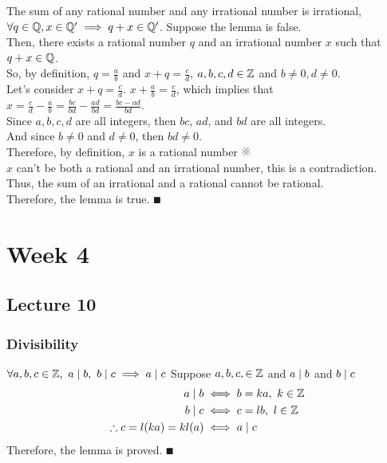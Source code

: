 \documentclass{report}
\begin{document}
\Lemma The sum of any rational number and any irrational number is irrational, $\forall q\in\mathbb{Q}, x\in\mathbb{Q}' \implies q + x \in \mathbb{Q}'$.
\proof Suppose the lemma is false. \\
Then, there exists a rational number $q$ and an irrational number $x$ such that $q + x \in \mathbb{Q}$. \\
So, by definition, $q = \frac{a}{b}$ and $x + q = \frac{c}{d}$, $a,b,c,d\in\mathbb{Z}$ and $b\neq0,d\neq0$. \\
Let's consider $x + q = \frac{c}{d}$. $x + \frac{a}{b} = \frac{c}{d}$, which implies that $x = \frac{c}{d} - \frac{a}{b} = \frac{bc}{bd} - \frac{ad}{bd} = \frac{bc - ad}{bd}$. \\
Since $a,b,c,d$ are all integers, then $bc$, $ad$, and $bd$ are all integers. \\
And since $b\neq0$ and $d\neq0$, then $bd\neq0$. \\
Therefore, by definition, $x$ is a rational number $\CONTRA$ \\
$x$ can't be both a rational and an irrational number, this is a contradiction. \\
Thus, the sum of an irrational and a rational cannot be rational. \\
Therefore, the lemma is true. $\QED$

\chapter{Week 4}
\section{Lecture 10}
\subsection*{Divisibility}

\Lemma $\forall a,b,c\in\mathbb{Z},\ a\mathrel{\mid} b,\ b\mathrel{\mid} c \implies a\mathrel{\mid} c$
\proof  Suppose $a,b,c,\in\mathbb{Z}$ and $a\mathrel{\mid} b$ and $b\mathrel{\mid} c$ 
\begin{align*}
	a\mathrel{\mid} b &\iff b = ka,\ k\in\mathbb{Z} \\
	b\mathrel{\mid} c &\iff c = lb,\ l\in\mathbb{Z} \\
	\therefore c = l(ka) = kl(a) &\iff a \mathrel{\mid} c   
\end{align*}
Therefore, the lemma is proved. $\QED$
\end{document}
